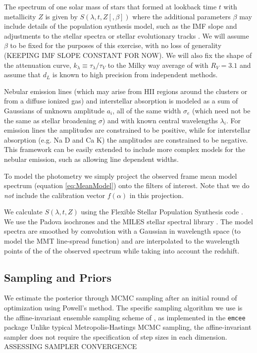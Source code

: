 \documentclass[12pt, letterpaper, preprint]{aastex}
\begin{document}
The spectrum of one solar mass of stars that formed at lookback time
$t$ with metallicity $Z$ is given by $S(\lambda, t, Z [, \beta])$
where the additional parameters $\beta$ may include details of the
population synthesis model, such as the IMF slope and adjustments to
the stellar spectra or stellar evolutionary tracks
\citep[e.g.][]{FSPS}. We will assume $\beta$ to be fixed for the
purposes of this exercise, with no loss of generality (KEEPING IMF
SLOPE CONSTANT FOR NOW).  We will also fix the shape of the
attenuation curve, $k_\lambda \equiv \tau_\lambda/\tau_V$ to the Milky
way average of \citet{CCM89} with $R_V=3.1$ and assume that $d_L$ is
known to high precision from independent methods.

Nebular emission lines (which may arise from HII regions around the
clusters or from a diffuse ionized gas) and interstellar absorption is
modeled as a sum of Gaussians of unknown amplitude $a_i$, all of the
same width $\sigma_e$ (which need not be the same as stellar
broadening $\sigma$) and with known central wavelengths $\lambda_i$.
For emission lines the amplitudes are constrained to be positive,
while for interstellar absorption (e.g. Na D and Ca K) the amplitudes
are constrained to be negative. This framework can be easily extended
to include more complex models for the nebular emission, such as
allowing line dependent widths.

To model the photometry we simply project the observed frame mean
model spectrum (equation \ref{eq:MeanModel}) onto the filters of
interest.  Note that we do \emph{not} include the calibration vector
$f(\alpha)$ in this projection.

We calculate $S(\lambda, t, Z)$ using the Flexible Stellar Population
Synthesis code \citep[FSPS][]{FSPS}.  We use the Padova isochrones
\citep{Padova} and the MILES stellar spectral library \citep{MILES}.  The model
spectra are smoothed by convolution with a Gaussian in wavelength
space (to model the MMT line-spread function) and are interpolated to
the wavelength points of the of the observed spectrum while taking
into account the redshift.

\subsection{Sampling and Priors}

We estimate the posterior through MCMC sampling after an initial round
of optimization using Powell's method.  The specific sampling
algorithm we use is the affine-invariant ensemble sampling scheme of
\citet{GW}, as implemented in the \texttt{emcee} package \cite{dfm}
Unlike typical Metropolis-Hastings MCMC sampling, the affine-invariant
sampler does not require the specification of step sizes in each
dimension.  ASSESSING SAMPLER CONVERGENCE
 
\end{document}
